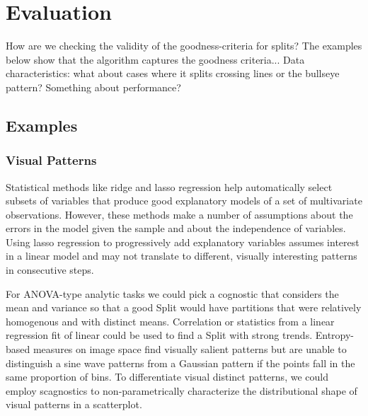 \section{Evaluation}
\label{sec:evaluation}
How are we checking the validity of the goodness-criteria for splits? The examples below show that the algorithm captures the goodness criteria...
Data characteristics: what about cases where it splits crossing lines or the bullseye pattern?
Something about performance?

\subsection{Examples}
\subsubsection{Visual Patterns}

Statistical methods like ridge and lasso regression help automatically select subsets of variables that produce good explanatory models of a set of multivariate observations. However, these methods make a number of assumptions about the errors in the model given the sample and about the independence of  variables. Using lasso regression to progressively add explanatory variables assumes interest in a linear model and may not translate to different, visually interesting  patterns in consecutive steps.


For ANOVA-type analytic tasks we could pick a cognostic that considers the mean and variance so that a good Split would have partitions that were relatively homogenous and with distinct means. Correlation or statistics from a linear regression fit of linear could be used to find a Split with strong trends. Entropy-based measures on image space find visually salient patterns but are unable to distinguish a sine wave patterns from a Gaussian pattern if the points fall in the same proportion of bins. To differentiate visual distinct patterns, we could employ scagnostics to non-parametrically characterize the distributional shape of visual patterns in a scatterplot.



